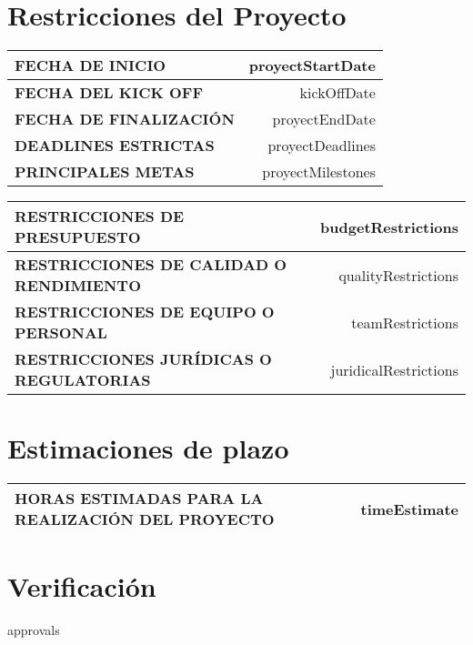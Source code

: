 \documentclass[12pt]{article}
\begin{document}
    \section{Restricciones del Proyecto}
    \noindent
    \begin{tabularx}{\textwidth}{|>{}L|R|}
        \hline
        \textbf{FECHA DE INICIO} & {{proyectStartDate}} \\
        \hline
        \textbf{FECHA DEL KICK OFF} & {{kickOffDate}} \\
        \hline
        \textbf{FECHA DE FINALIZACIÓN} & {{proyectEndDate}} \\
        \hline
        \textbf{DEADLINES ESTRICTAS} & {{proyectDeadlines}} \\
        \hline
        \textbf{PRINCIPALES METAS} & {{proyectMilestones}} \\
        \hline
    \end{tabularx}

    \vspace{2mm}

    \noindent
    \begin{tabularx}{\textwidth}{|>{}L|R|}
        \hline
        \textbf{RESTRICCIONES DE PRESUPUESTO} & {{budgetRestrictions}} \\
        \hline
        \textbf{RESTRICCIONES DE CALIDAD O RENDIMIENTO} & {{qualityRestrictions}} \\
        \hline
        \textbf{RESTRICCIONES DE EQUIPO O PERSONAL} & {{teamRestrictions}} \\
        \hline
        \textbf{RESTRICCIONES JURÍDICAS O REGULATORIAS} & {{juridicalRestrictions}} \\
        \hline
    \end{tabularx}

    \section{Estimaciones de plazo}
    \noindent
    \begin{tabularx}{\textwidth}{|>{}L|R|}
        \hline
        \textbf{HORAS ESTIMADAS PARA LA REALIZACIÓN DEL PROYECTO} & {{timeEstimate}} \\
        \hline
    \end{tabularx}

    \section{Verificación}
    {{approvals}}
\end{document}
